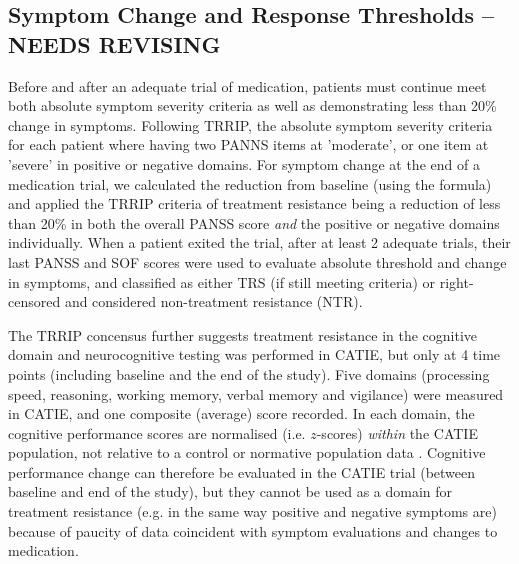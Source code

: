 \documentclass[a4paper,nobib]{article}
\begin{document}
\subsection*{Symptom Change and Response Thresholds -- NEEDS REVISING}
Before and after an adequate trial of medication, patients must continue meet both absolute symptom severity criteria as well as demonstrating less than 20\% change in symptoms.  Following TRRIP, the absolute symptom severity criteria for each patient where having two PANNS items at 'moderate', or one item at 'severe' in positive or negative domains.  For symptom change at the end of a medication trial, we calculated the reduction from baseline (using the \cite{Leucht2009} formula) and applied the TRRIP criteria of treatment resistance being a reduction of less than 20\% in both the overall PANSS score \emph{and} the positive or negative domains individually. When a patient exited the trial, after at least 2 adequate trials, their last PANSS and SOF scores were used to evaluate absolute threshold and change in symptoms, and classified as either TRS (if still meeting criteria) or right-censored and considered non-treatment resistance (NTR). 

The TRRIP concensus further suggests treatment resistance in the cognitive domain and neurocognitive testing was performed in CATIE, but only at 4 time points (including baseline and the end of the study). Five domains (processing speed, reasoning, working memory, verbal memory and vigilance) were measured in CATIE, and one composite (average) score recorded. In each domain, the cognitive performance scores are normalised (i.e. $z$-scores) \emph{within} the CATIE population, not relative to a control or normative population data \citep{keefe2006baseline}.  Cognitive performance change can therefore be evaluated in the CATIE trial (between baseline and end of the study), but they cannot be used as a domain for treatment resistance (e.g. in the same way positive and negative symptoms are) because of paucity of data coincident with symptom evaluations and changes to medication.
\end{document}
